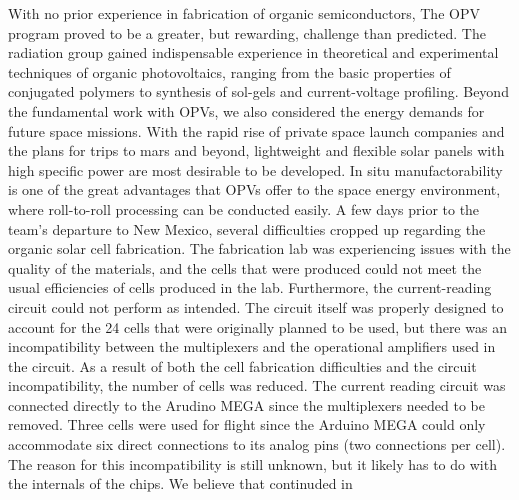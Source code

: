 	With no prior experience in fabrication of organic semiconductors, The OPV program proved to be a greater, but rewarding, challenge than predicted. The radiation group gained indispensable experience in theoretical and experimental techniques of organic photovoltaics, ranging from the basic properties of conjugated polymers to synthesis of sol-gels and current-voltage profiling. Beyond the fundamental work with OPVs, we also considered the energy demands for future space missions. With the rapid rise of private space launch companies and the plans for trips to mars and beyond, lightweight and flexible solar panels with high specific power are most desirable to be developed. In situ manufactorability is one of the great advantages that OPVs offer to the space energy environment, where roll-to-roll processing can be conducted easily. 
A few days prior to the team's departure to New Mexico, several difficulties cropped up regarding the organic solar cell fabrication.
The fabrication lab was experiencing issues with the quality of the materials, and the cells that were produced could not meet the usual efficiencies of cells produced in the lab.
Furthermore, the current-reading circuit could not perform as intended.
The circuit itself was properly designed to account for the 24 cells that were originally planned to be used, but there was an incompatibility between the multiplexers and the operational amplifiers used in the circuit.
As a result of both the cell fabrication difficulties and the circuit incompatibility, the number of cells was reduced.
The current reading circuit was connected directly to the Arudino MEGA since the multiplexers needed to be removed.
Three cells were used for flight since the Arduino MEGA could only accommodate six direct connections to its analog pins (two connections per cell).
The reason for this incompatibility is still unknown, but it likely has to do with the internals of the chips.
We believe that continuded in
